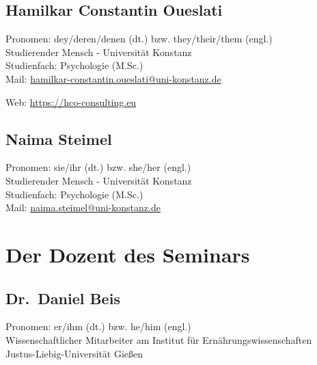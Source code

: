 \documentclass[
  a4paper,
]{report}
\begin{document}
\hypertarget{hcoueslati}{%
\subsection*{Hamilkar Constantin Oueslati}\label{hcoueslati}}

Pronomen: dey/deren/denen (dt.) bzw. they/their/them (engl.)\\
Studierender Mensch - Universität Konstanz\\
Studienfach: Psychologie (M.Sc.)\\

Mail: \href{mailto:hamilkar-constantin.oueslati@uni-konstanz.de?subject=Freier\%20Wille\%20als\%20Illusion\%20oder\%20Notwendigkeit}{hamilkar-constantin.oueslati@uni-konstanz.de}

Web: \url{https://hco-consulting.eu}

\hypertarget{nsteimel}{%
\subsection*{Naima Steimel}\label{nsteimel}}

Pronomen: sie/ihr (dt.) bzw. she/her (engl.)\\
Studierender Mensch - Universität Konstanz\\
Studienfach: Psychologie (M.Sc.)\\

Mail: \href{mailto:naima.steimel@uni-konstanz.de?subject=Freier\%20Wille\%20als\%20Illusion\%20oder\%20Notwendigkeit}{naima.steimel@uni-konstanz.de}

\hypertarget{lecturer}{%
\section*{Der Dozent des Seminars}\label{lecturer}}

\hypertarget{dbeis}{%
\subsection*{Dr.~Daniel Beis}\label{dbeis}}

Pronomen: er/ihm (dt.) bzw. he/him (engl.)\\
Wissenschaftlicher Mitarbeiter am Institut für Ernährungswissenschaften\\
Justus-Liebig-Universität Gießen\\
\end{document}
